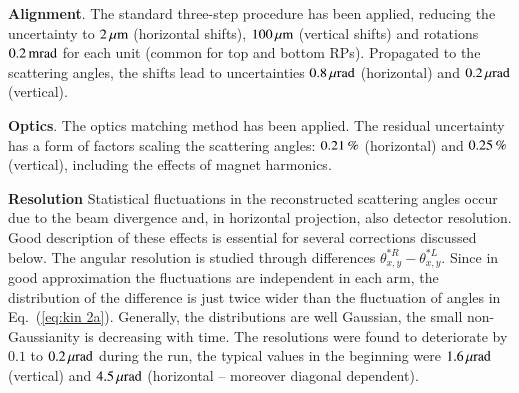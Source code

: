 {\bf Alignment}. The standard three-step procedure \cite{totem-ijmp} has been applied, reducing the uncertainty to $2\,{\rm \mu m}$ (horizontal shifts), $100\,{\rm \mu m}$ (vertical shifts) and rotations $0.2\,{\rm mrad}$ for each unit (common for top and bottom RPs). Propagated to the scattering angles, the shifts lead to uncertainties %
$0.8\,{\rm \mu rad}$ (horizontal) and $0.2\,{\rm \mu rad}$ (vertical).

{\bf Optics}. The optics matching method \cite{totem-optics} has been applied. The residual uncertainty has a form of factors scaling the scattering angles: %
$0.21\,{\rm \%}$ (horizontal) and $0.25\,{\rm \%}$ (vertical), including the effects of magnet harmonics.

{\bf Resolution} Statistical fluctuations in the reconstructed scattering angles occur due to the beam divergence and, in horizontal projection, also detector resolution. Good description of these effects is essential for several corrections discussed below. The angular resolution is studied through differences $\theta_{x,y}^{*R} - \theta_{x,y}^{*L}$. Since in good approximation the fluctuations are independent in each arm, the distribution of the difference is just twice wider than the fluctuation of angles in Eq.~(\ref{eq:kin 2a}). Generally, the distributions are well Gaussian, the small non-Gaussianity is decreasing with time. The resolutions were found to deteriorate by $0.1$ to $0.2\,{\rm \mu rad}$ during the run, the typical values in the beginning were $1.6\,{\rm \mu rad}$ (vertical) and $4.5\,{\rm \mu rad}$ (horizontal -- moreover diagonal dependent).

